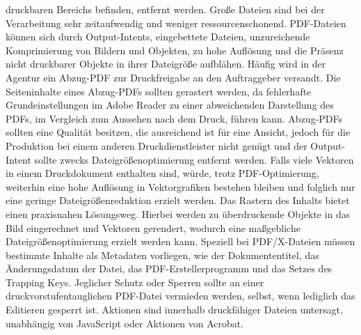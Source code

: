 druckbaren Bereichs befinden, entfernt werden. Große Dateien sind bei der Verarbeitung sehr zeitaufwendig und weniger ressourcenschonend. PDF-Dateien können sich durch Output-Intents, eingebettete Dateien, unzureichende Komprimierung von Bildern und Objekten, zu hohe Auflösung und die Präsenz nicht druckbarer Objekte in ihrer Dateigröße aufblähen. Häufig wird in der Agentur ein Abzug-PDF zur Druckfreigabe an den Auftraggeber versandt. Die Seiteninhalte eines Abzug-PDFs sollten gerastert werden, da fehlerhafte Grundeinstellungen im Adobe Reader zu einer abweichenden Darstellung des PDFs, im Vergleich zum Aussehen nach dem Druck, führen kann. Abzug-PDFs sollten eine Qualität besitzen, die ausreichend ist für eine Ansicht, jedoch für die Produktion bei einem anderen Druckdienstleister nicht genügt und der Output-Intent sollte zwecks Dateigrößenoptimierung entfernt werden. Falls viele Vektoren in einem Druckdokument enthalten sind, würde, trotz PDF-Optimierung, weiterhin eine hohe Auflösung in Vektorgrafiken bestehen bleiben und folglich nur eine geringe Dateigrößenreduktion erzielt werden. Das Rastern des Inhalts bietet einen praxisnahen Lösungsweg. Hierbei werden zu überdruckende Objekte in das Bild eingerechnet und Vektoren gerendert, wodurch eine maßgebliche Dateigrößenoptimierung erzielt werden kann. Speziell bei PDF/X-Dateien müssen bestimmte Inhalte als Metadaten vorliegen, wie der Dokumententitel, das Änderungsdatum der Datei, das PDF-Erstellerprogramm und das Setzes des Trapping Keys. Jeglicher Schutz oder Sperren sollte an einer druckvorstufentauglichen PDF-Datei vermieden werden, selbst, wenn lediglich das Editieren gesperrt ist. Aktionen sind innerhalb druckfähiger Dateien untersagt, unabhängig von JavaScript oder Aktionen von Acrobat. \\
